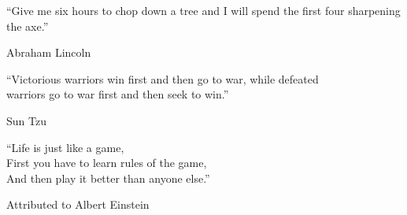 \vspace*{\fill}

\begin{flushright}

\epigraph{“Give me six hours to chop down a tree and I will spend the first four sharpening the axe.”}{Abraham Lincoln}

\vspace{0.5cm}

\epigraph{“Victorious warriors win first and then go to war, while defeated\\warriors go to war first and then seek to win.”}{Sun Tzu}

\vspace{0.5cm}

\epigraph{“Life is just like a game,\\First you have to learn rules of the game,\\And then play it better than anyone else.”}{Attributed to Albert Einstein}
    
\end{flushright}

\vspace*{\fill}
\cleardoublepage
